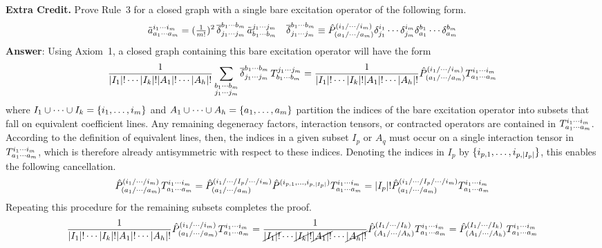 \documentclass[11pt]{article}
\begin{document}
\newpage
\noindent
\textbf{Extra Credit.}
Prove Rule~3 for a closed graph with a single bare excitation operator of the following form.
\begin{align*}
  \tilde{a}^{i_1\cdots i_m}_{a_1\cdots a_m}
=
  (\tfrac{1}{m!})^2\,
  \overline{\delta }_{j_1\cdots j_m}^{b_1\cdots b_m}\,
  \tilde{a}^{j_1\cdots j_m}_{b_1\cdots b_m}
&&
  \overline{\delta }_{j_1\cdots j_m}^{b_1\cdots b_m}
\equiv
  \hat{P}_{(a_1/\cdots/a_m)}^{(i_1/\cdots/i_m)}
  \delta _{j_1}^{i_1}
  \cdots
  \delta _{j_m}^{i_m}
  \delta _{a_1}^{b_1}
  \cdots
  \delta _{a_m}^{b_m}
\end{align*}
\textbf{Answer}:
Using Axiom~1, a closed graph containing this bare excitation operator will have the form
\begin{align*}
  \frac {1}{
    |I_1|!\cdots|I_k|!
    |A_1|!\cdots|A_h|!
  }
  \sum_{\substack{b_1\cdots b_m\\j_1\cdots j_m}}
  \overline{\delta }_{j_1\cdots j_m}^{b_1\cdots b_m}\,
  T_{b_1\cdots b_m}^{j_1\cdots j_m}
=
  \frac {1}{
    |I_1|!\cdots|I_k|!
    |A_1|!\cdots|A_h|!
  }
  \hat{P}_{(a_1/\cdots/a_m)}^{(i_1/\cdots/i_m)}
  T_{a_1\cdots a_m}^{i_1\cdots i_m}
\end{align*}
where $I_1\cup\cdots\cup I_k=\{i_1,\ldots, i_m\}$ and $A_1\cup\cdots\cup A_h=\{a_1,\ldots,a_m\}$ partition the indices of the bare excitation operator into subsets that fall on equivalent coefficient lines.
Any remaining degeneracy factors, interaction tensors, or contracted operators are contained in
$
  T_{a_1\cdots a_m}^{i_1\cdots i_m}
$.
According to the definition of equivalent lines, then, the indices in a given subset $I_p$ or $A_q$ must occur on a single interaction tensor in $T_{a_1\cdots a_m}^{i_1\cdots i_m}$, which is therefore already antisymmetric with respect to these indices.
Denoting the indices in $I_p$ by $\{i_{p,1},\ldots,i_{p,|I_p|}\}$, this enables the following cancellation.
\begin{align*}
  \hat{P}_{(a_1/\cdots/a_m)}^{(i_1/\cdots/i_m)}
  T_{a_1\cdots a_m}^{i_1\cdots i_m}
=
  \hat{P}_{(a_1/\cdots/a_m)}^{(i_1/\cdots/I_p/\cdots/i_m)}
  \hat{P}^{(i_{p,1},\ldots,i_{p,|I_p|})}
  T_{a_1\cdots a_m}^{i_1\cdots i_m}
=
  |I_p|!
  \hat{P}_{(a_1/\cdots/a_m)}^{(i_1/\cdots/I_p/\cdots/i_m)}
  T_{a_1\cdots a_m}^{i_1\cdots i_m}
\end{align*}
Repeating this procedure for the remaining subsets completes the proof.
\begin{align*}
  \frac {1}{
    |I_1|!\cdots|I_k|!
    |A_1|!\cdots|A_h|!
  }
  \hat{P}_{(a_1/\cdots/a_m)}^{(i_1/\cdots/i_m)}
  T_{a_1\cdots a_m}^{i_1\cdots i_m}
=
  \frac {1}{
    \cancel{|I_1|!}\cdots\cancel{|I_k|!}
    \cancel{|A_1|!}\cdots\cancel{|A_h|!}
  }
  \hat{P}_{(A_1/\cdots/A_h)}^{(I_1/\cdots/I_k)}
  T_{a_1\cdots a_m}^{i_1\cdots i_m}
=
  \hat{P}_{(A_1/\cdots/A_h)}^{(I_1/\cdots/I_k)}
  T_{a_1\cdots a_m}^{i_1\cdots i_m}
\end{align*} 
\end{document}
